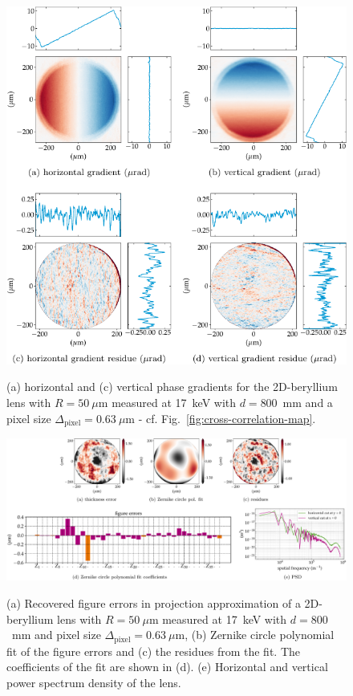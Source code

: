 \begin{refsection}
\begin{figure}[h]
        \centering
        {\includegraphics[width=.60\linewidth]{figures/ch04b/gradients.pdf}}
        \caption[Recovered phase gradient and residues]{(a) horizontal and (c) vertical phase gradients for the 2D-beryllium lens with $R=50~\mu$m measured at 17~keV with $d=800$~mm and a pixel size $\Delta_\text{pixel}= 0.63~\mu$m - cf. Fig.~\ref{fig:cross-correlation-map}.}\label{fig:gradients}
\end{figure}

\begin{figure}[h]
        \centering
        {\includegraphics[width=1\linewidth]{figures/ch04b/recovered_thickness.pdf}}
        \caption[Recovered figure errors in projection approximation]{(a) Recovered figure errors in projection approximation of a 2D-beryllium lens with $R=50~\mu$m measured at 17~keV with $d=800$~mm and pixel size $\Delta_\text{pixel}= 0.63~\mu$m, (b) Zernike circle polynomial fit of the figure errors and (c) the residues from the fit. The coefficients of the fit are shown in (d). (e) Horizontal and vertical power spectrum density of the lens.}\label{fig:recovered_thickness}
\end{figure}


\end{refsection}
